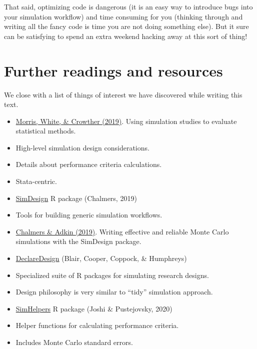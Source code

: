 \documentclass[
]{book}
\begin{document}
That said, optimizing code is dangerous (it is an easy way to introduce bugs into your simulation workflow) and time consuming for you (thinking through and writing all the fancy code is time you are not doing something else).
But it sure can be satisfying to spend an extra weekend hacking away at this sort of thing!

\chapter{Further readings and resources}\label{further-readings-and-resources}

We close with a list of things of interest we have discovered while writing this text.

\begin{itemize}
\item
  \href{https://doi.org/10.1002/sim.8086}{Morris, White, \& Crowther (2019)}. Using simulation studies to evaluate statistical methods.
\item
  High-level simulation design considerations.
\item
  Details about performance criteria calculations.
\item
  Stata-centric.
\item
  \href{https://github.com/philchalmers/SimDesign/wiki}{SimDesign} R package (Chalmers, 2019)
\item
  Tools for building generic simulation workflows.
\item
  \href{http://www.tqmp.org/RegularArticles/vol16-4/p248/}{Chalmers \& Adkin (2019)}. Writing effective and reliable Monte Carlo simulations with the SimDesign package.
\item
  \href{https://declaredesign.org/}{DeclareDesign} (Blair, Cooper, Coppock, \& Humphreys)
\item
  Specialized suite of R packages for simulating research designs.
\item
  Design philosophy is very similar to ``tidy'' simulation approach.
\item
  \href{https://meghapsimatrix.github.io/simhelpers/index.html}{SimHelpers} R package (Joshi \& Pustejovsky, 2020)
\item
  Helper functions for calculating performance criteria.
\item
  Includes Monte Carlo standard errors.
\end{itemize}

  
\end{document}
